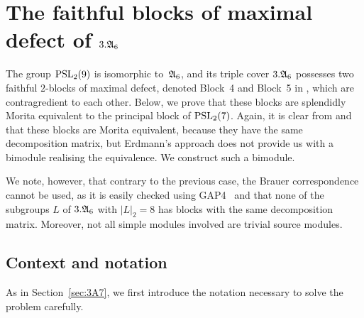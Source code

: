 \bigskip


\section{The faithful blocks of maximal defect of \texorpdfstring{$3.{\mathfrak{A}}_6$}{3.A6} }\label{sec:3A6}%

The group $\operatorname{PSL}_2(9)$ is isomorphic to~${\mathfrak{A}}_6$, and its triple cover $3.{\mathfrak{A}}_6$ possesses two faithful $2$-blocks of maximal defect, denoted Block~4 and Block~5 in \cite[A6mod2]{ModularAtlas}, which are contragredient to each other. 
Below, we prove that these blocks are splendidly Morita equivalent to the principal block of $\operatorname{PSL}_2(7)$. Again, it is clear from \cite{ErdmannTameBook} and \cite[Theorem~2.1]{MacGregor22} that these blocks are Morita equivalent, because they have the same decomposition matrix, but Erdmann's approach does not provide us with a bimodule realising the equivalence. We construct such a bimodule.\par
We note, however, that contrary to the previous case, the Brauer correspondence cannot be used, as it is easily checked using GAP4~\cite{GAP} and \cite[Theorem~2.1]{MacGregor22} that none of the subgroups $L$ of $3.{\mathfrak{A}}_6$ with $|L|_2=8$ has blocks with the same decomposition matrix. Moreover, not all simple modules involved are trivial source modules. 

\vspace{2mm}
\subsection{Context and notation}
As in Section~\ref{sec:3A7}, we first introduce the notation necessary to solve the problem carefully. 

